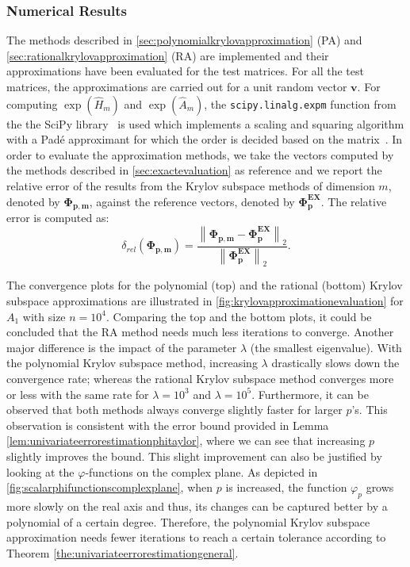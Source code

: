 \subsubsection*{Numerical Results}
The methods described in \autoref{sec:polynomialkrylovapproximation} (PA)
and \autoref{sec:rationalkrylovapproximation} (RA)
are implemented and their approximations have been evaluated for the test matrices.
For all the test matrices, the approximations are carried out for a unit
random vector $\mathbf{v}$.
For computing $\exp(\hat{H}_m)$ and $\exp(\hat{A}_m)$, the \texttt{scipy.linalg.expm}
function from the the SciPy library~\cite{SciPy2020} is used which implements a
scaling and squaring algorithm with a Padé approximant for which the order is decided
based on the matrix~\cite{almohy2010scaling}.
In order to evaluate the approximation methods, we take the vectors computed by the methods
described in \autoref{sec:exactevaluation} as reference and we report the relative
error of the results from the Krylov subspace methods of dimension $m$, denoted by
$\mathbf{\Phi_{p, m}}$, against the reference vectors, denoted by $\mathbf{\Phi_p^{EX}}$.
The relative error is computed as:
\begin{equation*}
    \delta_{rel}(\mathbf{\Phi_{p, m}}) =
    \frac{\left\| \mathbf{\Phi_{p, m}} - \mathbf{\Phi_p^{EX}} \right\|_2}
    {\left\| \mathbf{\Phi_p^{EX}} \right\|_2}.
\end{equation*}

The convergence plots for the polynomial (top) and the rational (bottom) Krylov subspace approximations are
illustrated in \autoref{fig:krylovapproximationevaluation} for $A_1$ with size $n=10^{4}$.
Comparing the top and the bottom plots, it could be concluded that the RA method needs
much less iterations to converge.
Another major difference is the impact of the parameter $\lambda$ (the smallest eigenvalue).
With the polynomial Krylov subspace method, increasing $\lambda$ drastically slows down the convergence rate;
whereas the rational Krylov subspace method converges more or less with the same rate for
$\lambda=10^{3}$ and $\lambda=10^{5}$.
Furthermore, it can be observed that both methods always converge slightly faster for
larger $p$'s. This observation is consistent with the error bound provided in Lemma
\ref{lem:univariateerrorestimationphitaylor}, where we can see that increasing $p$ slightly
improves the bound. This slight improvement can also be justified by looking at the
$\varphi$-functions on the complex plane. As depicted in
\autoref{fig:scalarphifunctionscomplexplane}, when $p$ is increased, the
function $\varphi_p$ grows more slowly on the real axis and thus, its changes can be
captured better by a polynomial of a certain degree.
Therefore, the polynomial Krylov subspace approximation needs fewer iterations to reach a certain
tolerance according to Theorem \ref{the:univariateerrorestimationgeneral}.

